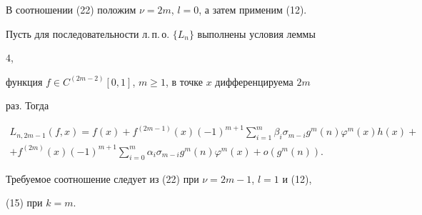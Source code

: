  


\begin{pf} 


В соотношении (22) положим $\nu=2m$, $l=0$, а затем применим (12). 


\end{pf} 


 


\begin{thm} 


Пусть для последовательности л.\,п.\,о. $\{L_n\}$ выполнены условия леммы 


$4$, 


функция $f\in C^{(2m-2)}[0,1]$, $m\ge1$, в точке $x$ дифференцируема $2m$ 


раз. Тогда 


\begin{multline*} 


L_{n,2m-1}(f,x)=f(x)+f^{(2m-1)}(x)(-1)^{m+1} 


\sum^m_{i=1}\beta_i\sigma_{m-i}g^m(n)\varphi^m(x)h(x)+ \\ 


% 


+ 


f^{(2m)}(x)(-1)^{m+1}\sum^m_{i=0}\alpha_i\sigma_{m-i} 


g^m(n)\varphi^m(x)+o(g^m(n)). 


\end{multline*} 


\end{thm} 


 


\begin{pf} 


Требуемое соотношение следует из (22) при $\nu=2m-1$, $l=1$ и (12), 


(15) при $k=m$. 


\end{pf} 


 


 


